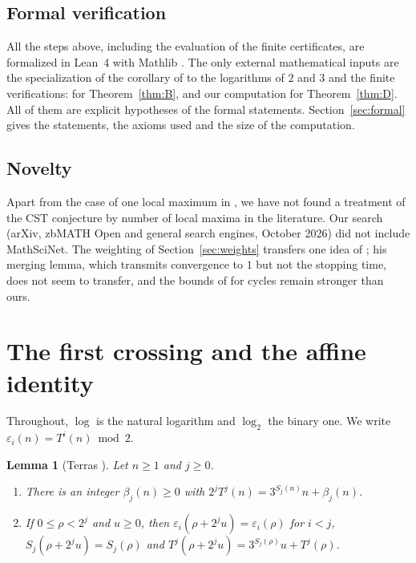 \documentclass[11pt]{amsart}
\newtheorem{lemma}[theorem]{Lemma}
\theoremstyle{definition}
\theoremstyle{remark}
\begin{document}
\subsection*{Formal verification}
All the steps above, including the evaluation of the finite certificates, are formalized in Lean~4 with Mathlib \cite{Lean4,Mathlib}. The only external mathematical inputs are the specialization of the corollary of \cite{LMN95} to the logarithms of $2$ and $3$ and the finite verifications: \cite[Corollary~5.4]{RT26} for Theorem~\ref{thm:B}, and our computation for Theorem~\ref{thm:D}. All of them are explicit hypotheses of the formal statements. Section~\ref{sec:formal} gives the statements, the axioms used and the size of the computation.

\subsection*{Novelty}
Apart from the case of one local maximum in \cite[Appendix~A]{RT26}, we have not found a treatment of the CST conjecture by number of local maxima in the literature. Our search (arXiv, zbMATH Open and general search engines, October 2026) did not include MathSciNet. The weighting of Section~\ref{sec:weights} transfers one idea of \cite{Her23}; his merging lemma, which transmits convergence to $1$ but not the stopping time, does not seem to transfer, and the bounds of \cite{Her23} for cycles remain stronger than ours.

\section{The first crossing and the affine identity}\label{sec:affine}

Throughout, $\log$ is the natural logarithm and $\log_2$ the binary one. We write $\varepsilon_i(n)=T^{i}(n)\bmod 2$.

\begin{lemma}[Terras \cite{Ter76}]\label{lem:affine}
Let $n\ge1$ and $j\ge0$.
\begin{enumerate}
\item There is an integer $\beta_j(n)\ge0$ with $2^{j}T^{j}(n)=3^{S_j(n)}n+\beta_j(n)$.
\item If $0\le \rho<2^{j}$ and $u\ge0$, then $\varepsilon_i(\rho+2^{j}u)=\varepsilon_i(\rho)$ for $i<j$, $S_j(\rho+2^{j}u)=S_j(\rho)$ and $T^{j}(\rho+2^{j}u)=3^{S_j(\rho)}u+T^{j}(\rho)$.
\end{enumerate}
\end{lemma}
\end{document}
